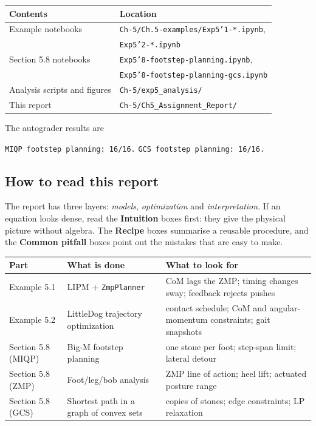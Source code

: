 \documentclass[11pt]{article}
\begin{document}
\begin{center}
\begin{tabular}{ll}
\toprule
Contents & Location \\
\midrule
Example notebooks & \texttt{Ch-5/Ch.5-examples/Exp5'1-*.ipynb}, \\
 & \texttt{Exp5'2-*.ipynb} \\
Section 5.8 notebooks & \texttt{Exp5'8-footstep-planning.ipynb}, \\
 & \texttt{Exp5'8-footstep-planning-gcs.ipynb} \\
Analysis scripts and figures & \texttt{Ch-5/exp5\_analysis/} \\
This report & \texttt{Ch-5/Ch5\_Assignment\_Report/} \\
\bottomrule
\end{tabular}
\end{center}

The autograder results are
\begin{center}
\texttt{MIQP footstep planning: 16/16.}\qquad
\texttt{GCS footstep planning: 16/16.}
\end{center}

\subsection*{How to read this report}

The report has three layers: \emph{models}, \emph{optimization} and
\emph{interpretation}.  If an equation looks dense, read the \textbf{Intuition}
boxes first: they give the physical picture without algebra.  The
\textbf{Recipe} boxes summarise a reusable procedure, and the
\textbf{Common pitfall} boxes point out the mistakes that are easy to make.

\begin{center}
\small
\begin{tabular}{p{}p{}p{}}
\toprule
Part & What is done & What to look for \\
\midrule
Example 5.1 & LIPM + \texttt{ZmpPlanner} & CoM lags the ZMP; timing changes
sway; feedback rejects pushes \\
Example 5.2 & LittleDog trajectory optimization & contact schedule; CoM and
angular-momentum constraints; gait snapshots \\
Section 5.8 (MIQP) & Big-M footstep planning & one stone per foot; step-span
limit; lateral detour \\
Section 5.8 (ZMP) & Foot/leg/bob analysis & ZMP line of action; heel lift;
actuated posture range \\
Section 5.8 (GCS) & Shortest path in a graph of convex sets & copies of
stones; edge constraints; LP relaxation \\
\bottomrule
\end{tabular}
\end{center}
\end{document}
